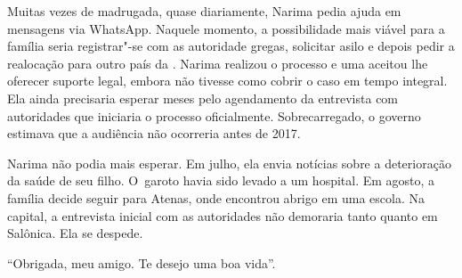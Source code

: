 Muitas vezes de madrugada, quase diariamente, Narima pedia ajuda em
mensagens via WhatsApp. Naquele momento, a possibilidade mais viável
para a família seria registrar"-se com as autoridade gregas, solicitar
asilo e depois pedir a realocação para outro país da . Narima realizou
o processo e uma  aceitou lhe oferecer suporte legal, embora não
tivesse como cobrir o caso em tempo integral. Ela ainda precisaria
esperar meses pelo agendamento da entrevista com autoridades que
iniciaria o processo oficialmente. Sobrecarregado, o governo estimava
que a audiência não ocorreria antes de 2017.

Narima não podia mais esperar. Em julho, ela envia notícias sobre a
deterioração da saúde de seu filho. O~garoto havia sido levado a um
hospital. Em agosto, a família decide seguir para Atenas, onde encontrou
abrigo em uma escola. Na capital, a entrevista inicial com as
autoridades não demoraria tanto quanto em Salônica. Ela se despede.

``Obrigada, meu amigo. Te desejo uma boa vida''.


